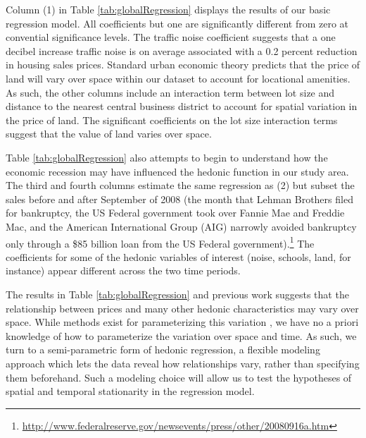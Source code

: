 \documentclass{article}\usepackage{graphicx, color}
\begin{document}
Column (1) in Table \ref{tab:globalRegression} displays the results of our basic regression model. All coefficients but one are significantly different from zero at convential significance levels. The traffic noise coefficient suggests that a one decibel increase traffic noise is on average associated with a 0.2 percent reduction in housing sales prices. Standard urban economic theory \citep{Alonso1964, Mills1967, Muth1969} predicts that the price of land will vary over space within our dataset to account for locational amenities. As such, the other columns include an interaction term between lot size and distance to the nearest central business district to account for spatial variation in the price of land. The significant coefficients on the lot size interaction terms suggest that the value of land varies over space. 

Table \ref{tab:globalRegression} also attempts to begin to understand how the economic recession may have influenced the hedonic function in our study area. The third and fourth columns estimate the same regression as (2) but subset the sales before and after September of 2008 (the month that Lehman Brothers filed for bankruptcy, the US Federal government took over Fannie Mae and Freddie Mac, and the American International Group (AIG) narrowly avoided bankruptcy only through a \$85 billion loan from the US Federal government).\footnote{\url{http://www.federalreserve.gov/newsevents/press/other/20080916a.htm}} The coefficients for some of the hedonic variables of interest (noise, schools, land, for instance) appear different across the two time periods.

The results in Table \ref{tab:globalRegression} and previous work \citep[such as][]{Day2007, MarmolejoDuarteCarlos;GonzalezTamez2009} suggests that the relationship between prices and many other hedonic characteristics may vary over space. While methods exist for parameterizing this variation \citep[such as spatial expansion as suggested by][]{Casetti1972}, we have no a priori knowledge of how to parameterize the variation over space and time. As such, we turn to a semi-parametric form of hedonic regression, a flexible modeling approach which lets the data reveal how relationships vary, rather than specifying them beforehand. Such a modeling choice will allow us to test the hypotheses of spatial and temporal stationarity in the regression model.
\end{document}
